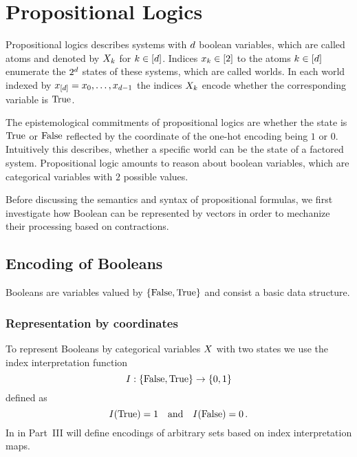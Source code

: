 \section{Propositional Logics}\label{cha:logicalRepresentation}

Propositional logics describes systems with $d$ boolean variables, which are called atoms and denoted by $X_{k}$ for $k\in[d]$.
Indices $x_{k}\in[2]$ to the atoms $k\in[d]$ enumerate the $2^d$ states of these systems, which are called worlds.
In each world indexed by $x_{[d]}=x_{0},\ldots,x_{d-1}$ the indices $X_{k}$ encode whether the corresponding variable is $\mathrm{True}$. 

The epistemological commitments of propositional logics are whether the state is $\mathrm{True}$ or $\mathrm{False}$ reflected by the coordinate of the one-hot encoding being $1$ or $0$.
Intuitively this describes, whether a specific world can be the state of a factored system.
Propositional logic amounts to reason about boolean variables, which are categorical variables with $2$ possible values.


Before discussing the semantics and syntax of propositional formulas, we first investigate how Boolean can be represented by vectors in order to mechanize their processing based on contractions.

\subsection{Encoding of Booleans}

Booleans are variables valued by $\{\mathrm{False},\mathrm{True}\}$ and consist a basic data structure.

\subsubsection{Representation by coordinates}

To represent Booleans by categorical variables $X$ with two states we use the index interpretation function
	\[ I:\{\mathrm{False},\mathrm{True}\}\rightarrow\{0,1\} \]
defined as
    	\[ I(\mathrm{True}) = 1 \quad \text{and} \quad I(\mathrm{False}) = 0 \, . \]
In  in Part~III will define encodings of arbitrary sets based on index interpretation maps.

